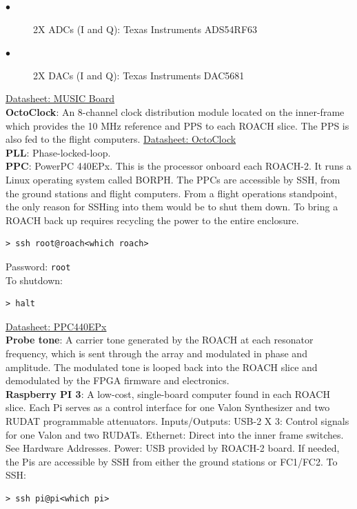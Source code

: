 \begin{description}
  \item[$\bullet$] 2X ADCs (I and Q): Texas Instruments ADS54RF63
  \item[$\bullet$] 2X DACs (I and Q): Texas Instruments DAC5681
\end{description}
\href{https://www.techneinstruments.com/boards-for-roach}{Datasheet: MUSIC Board}\\
\textbf{OctoClock}: An 8-channel clock distribution module located on the inner-frame which provides the 10 MHz reference and PPS to each ROACH slice. The PPS is also fed to the flight computers. \href{https://www.ettus.com/product/details/OctoClock}{Datasheet: OctoClock}\\
\textbf{PLL}: Phase-locked-loop.\\
\textbf{PPC}: PowerPC 440EPx. This is the processor onboard each ROACH-2. It runs a Linux operating system called BORPH. The PPCs are accessible by SSH, from the ground stations and flight computers. From a flight operations standpoint, the only reason for SSHing into them would be to shut them down. To bring a ROACH back up requires recycling the power to the entire enclosure.
\begin{verbatim}
> ssh root@roach<which roach>
\end{verbatim}
Password: \texttt{root}\\
To shutdown:
\begin{verbatim}
> halt
\end{verbatim}
\href{http://c1170156.r56.cf3.rackcdn.com/UK_AMC_PPC440EPx-SUA400T_2DS.pdf}{Datasheet: PPC440EPx}\\
\textbf{Probe tone}: A carrier tone generated by the ROACH at each resonator frequency, which is sent through the array and modulated in phase and amplitude. The modulated tone is looped back into the ROACH slice and demodulated by the FPGA firmware and electronics.\\
\textbf{Raspberry PI 3}: A low-cost, single-board computer found in each ROACH slice. Each Pi serves as a control interface for one Valon Synthesizer and two RUDAT programmable attenuators.
Inputs/Outputs:
USB-2 X 3: Control signals for one Valon and two RUDATs.
Ethernet: Direct into the inner frame switches. See Hardware Addresses.
Power: USB provided by ROACH-2 board.
If needed, the Pis are accessible by SSH from either the ground stations or FC1/FC2. To SSH:\
\begin{verbatim}
> ssh pi@pi<which pi>
\end{verbatim}
